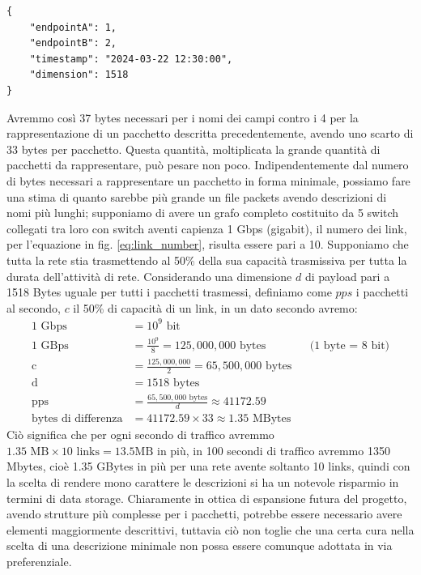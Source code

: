 \documentclass[binding=0.6cm]{sapthesis}
\begin{document}
{\scriptsize %
\begin{lstlisting}[caption={Rappresentazione di un pacchetto con descrizione completa}, label={codice:long_description_packet}]
{
    "endpointA": 1,
    "endpointB": 2,
    "timestamp": "2024-03-22 12:30:00",
    "dimension": 1518
}
\end{lstlisting}
}

Avremmo così 37 bytes necessari per i nomi dei campi contro i 4 per la rappresentazione di un pacchetto descritta precedentemente, avendo uno scarto di
33 bytes per pacchetto. Questa quantità, moltiplicata la grande quantità di pacchetti da rappresentare, può pesare non poco.
Indipendentemente dal numero di bytes necessari a rappresentare un pacchetto in forma minimale, possiamo fare una stima di quanto sarebbe più grande
un file packets avendo descrizioni di nomi più lunghi; supponiamo di avere un grafo completo costituito da 5 switch collegati tra loro con switch
aventi capienza 1 Gbps (gigabit), il numero dei link, per l'equazione in fig. \ref{eq:link_number}, risulta essere pari a 10. Supponiamo che tutta la rete
stia trasmettendo al 50\% della sua capacità trasmissiva per tutta la durata dell'attività di rete. Considerando una dimensione \(d\) di payload pari 
a 1518 Bytes uguale per tutti i pacchetti trasmessi,
definiamo come \(pps\) i pacchetti al secondo, \(c\) il 50\% di capacità di un link, in un dato secondo avremo:
\begin{align*}
    \text{1 Gbps} &= 10^9 \text{ bit}\\
    \text{1 GBps} &= \frac{10^9}{8} = 125,000,000 \text{ bytes} && \text{(1 byte = 8 bit)} \\
    \text{c} &= \frac{125,000,000}{2} = 65,500,000 \text{ bytes}\\
    \text{d} &= 1518 \text{ bytes} \\
    \text{pps} &= \frac{65,500,000 \text{ bytes}}{d}\approx 41172.59\\
    \text{bytes di differenza} &= 41172.59 \times 33 \approx 1.35 \text{ MBytes}
\end{align*}
Ciò significa che per ogni secondo di traffico avremmo \(1.35 \text{ MB} \times 10\text{ links} = 13.5 \text{MB}\) in più, 
 in 100 secondi di traffico avremmo 1350 Mbytes, cioè 1.35 GBytes in più per una rete avente soltanto 10 links, quindi con la scelta di rendere
  mono carattere le descrizioni
 si ha un notevole risparmio in termini di data storage. Chiaramente in ottica di espansione futura del progetto, avendo strutture più complesse
 per i pacchetti, potrebbe essere necessario avere elementi maggiormente descrittivi, tuttavia ciò non toglie che una certa cura nella scelta di una 
 descrizione minimale non possa essere comunque adottata in via preferenziale.
\end{document}
